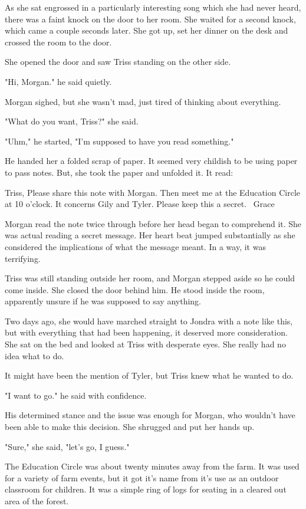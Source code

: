 \documentclass[courier]{sffms}
\begin{document}
As she sat engrossed in a particularly interesting song
which she had never heard, there was a faint knock
on the door to her room. She waited for a second
knock, which came a couple seconds later. She got up,
set her dinner on the desk and crossed the room to
the door.

She opened the door and saw Triss standing on the
other side.

"Hi, Morgan." he said quietly.

Morgan sighed, but she wasn't mad, just tired of thinking
about everything.

"What do you want, Triss?" she said.

"Uhm," he started, "I'm supposed to have you read
something."

He handed her a folded scrap of paper. It seemed
very childish to be using paper to pass notes. But,
she took the paper and unfolded it. It read:

Triss,
Please share this note with Morgan. Then
meet me at the Education Circle at
10 o'clock. It concerns Gily and Tyler.
Please keep this a secret.
~Grace

Morgan read the note twice through before her head
began to comprehend it. She was actual reading a
secret message. Her heart beat jumped substantially
as she considered the implications of what the
message meant. In a way, it was terrifying.

Triss was still standing outside her room, and Morgan
stepped aside so he could come inside. She closed
the door behind him. He stood inside the room,
apparently unsure if he was supposed to say anything.

Two days ago, she would have marched straight to
Jondra with a note like this, but with everything that
had been happening, it deserved more consideration.
She sat on the bed and looked at Triss with desperate
eyes. She really had no idea what to do.

It might have been the mention of Tyler, but Triss knew
what he wanted to do.

"I want to go." he said with confidence.

His determined stance and the issue was enough for
Morgan, who wouldn't have been able to make this
decision. She shrugged and put her hands up.

"Sure," she said, "let's go, I guess."

The Education Circle was about twenty minutes away
from the farm. It was used for a variety of farm events,
but it got it's name from it's use as an outdoor
classroom for children. It was a simple ring of logs
for seating in a cleared out area of the forest.
\end{document}
